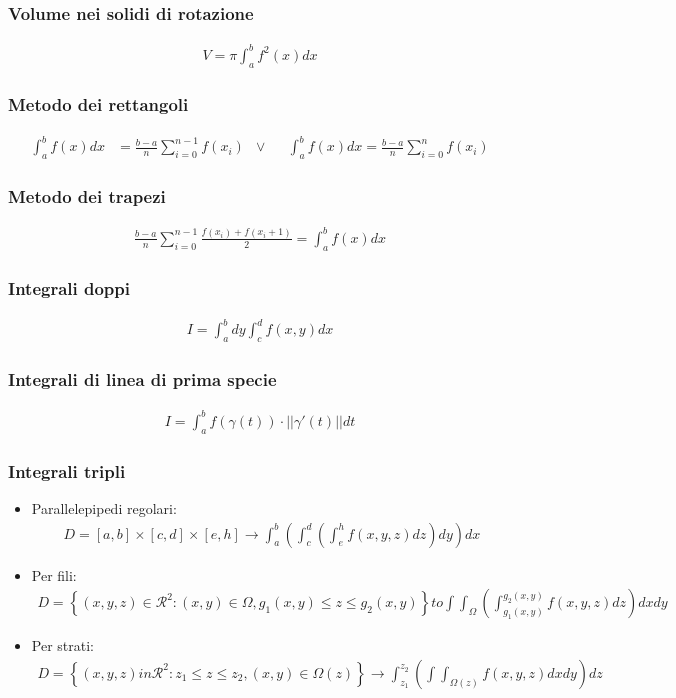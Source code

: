 \documentclass[a4paper]{article}
\begin{document}
	\subsubsection*{Volume nei solidi di rotazione}
	\begin{align*}
		V =\pi \int_{a}^{b} f^2(x)dx
	\end{align*}
	
	\subsubsection*{Metodo dei rettangoli}
	\begin{align*}
		\int_{a}^{b}f(x)dx &= \frac{b-a}{n}\sum_{i=0}^{n-1}f(x_i)		&\vee&	&	\int_{a}^{b} f(x)dx =\frac{b-a}{n}\sum_{i=0}^{n} f(x_i)		
	\end{align*}
	
	\subsubsection*{Metodo dei trapezi}
	\begin{align*}
		\frac{b-a}{n}\sum_{i=0}^{n-1}\frac{f(x_i)+f(x_i + 1)}{2} = \int_{a}^{b} f(x)dx
	\end{align*}
	
	\newpage
	\subsubsection*{Integrali doppi}
	\begin{align*}
		I = \int_{a}^{b}dy\int_{c}^{d}f(x,y)dx
	\end{align*}
	\subsubsection*{Integrali di linea di prima specie}
	\begin{align*}
		I = \int_{a}^{b}f(\gamma (t)) \cdot ||\gamma'(t)||dt
	\end{align*}
	\subsubsection*{Integrali tripli}
	\begin{itemize}
		\item Parallelepipedi regolari:
		\begin{align*}
			D = [a,b] \times [c,d] \times [e,h] \to \int_{a}^{b}\left( \int_{c}^{d} \left( \int_{e}^{h} f(x,y,z) dz \right) dy \right) dx
		\end{align*}		
		\item Per fili:
		\begin{align*}
			D = \left\lbrace  (x,y,z) \in \mathcal{R}^2:(x,y) \in \Omega,g_1(x,y) \le z \le g_2(x,y) \right\rbrace to \int \int_{\Omega} \left( \int_{g_1(x,y)}^{g_2(x,y)}f(x,y,z)dz \right)dxdy
		\end{align*}
		\item Per strati:
		\begin{align*}
		D =	\left\lbrace (x,y,z) in \mathcal{R}^2:z_1 \le z \le z_2 , (x,y) \in \Omega (z) \right\rbrace \to \int_{z_1}^{z_2} \left( \int \int_{\Omega (z)} f(x,y,z)dxdy \right)dz
		\end{align*}
	\end{itemize}
	
\end{document}
